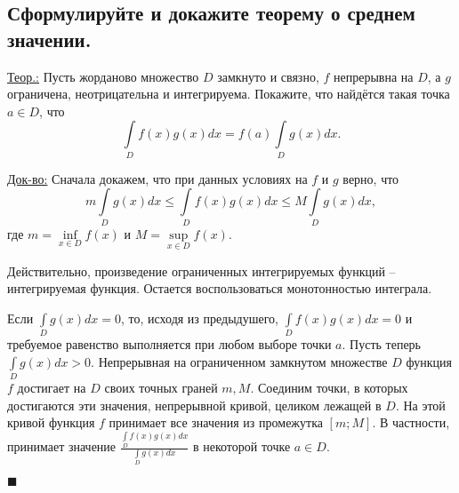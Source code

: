 
\subsection{Сформулируйте и докажите теорему о среднем значении.}
\underline{Теор.:} 
	Пусть жорданово множество $D$ замкнуто и связно, $f$ непрерывна на $D$,
	а $g$ ограничена, неотрицательна и интегрируема. Покажите, что
	найдётся такая точка $a \in D$, что
	\[ \int\limits_D f(x)g(x)dx = f(a)\int\limits_D g(x)dx.\]

\underline{Док-во:} 
	Сначала докажем, что при данных условиях на $f$ и $g$ верно, что
	\[ m \int\limits_{D}g(x)dx \leq \int\limits_{D}f(x)g(x)dx \leq M \int\limits_{D}g(x)dx,\]
    где $m = \inf\limits_{x\in D}f(x)$ и $M = \sup\limits_{x \in D}f(x)$.

    Действительно, произведение ограниченных интегрируемых функций -- интегрируемая функция.
	Остается воспользоваться монотонностью интеграла.

	Если $\int\limits_D g(x)dx = 0$, то, исходя из предыдушего,
	$\int\limits_D f(x)g(x)dx = 0$ и требуемое равенство выполняется
	при любом выборе точки $a$. Пусть теперь $\int\limits_D g(x)dx > 0$.
	Непрерывная на ограниченном замкнутом множестве $D$ функция $f$ достигает
	на $D$ своих точных граней $m, M$. Соединим точки, в которых достигаются
	эти значения, непрерывной кривой, целиком лежащей в $D$. На этой
	кривой функция $f$ принимает все значения из промежутка $[m; M]$.
	В частности, принимает значение $\frac{\int\limits_D f(x)g(x)dx}{\int\limits_D g(x)dx}$
	в некоторой точке $a \in D$.
    \begin{flushright}
    $\blacksquare$
    \end{flushright}

